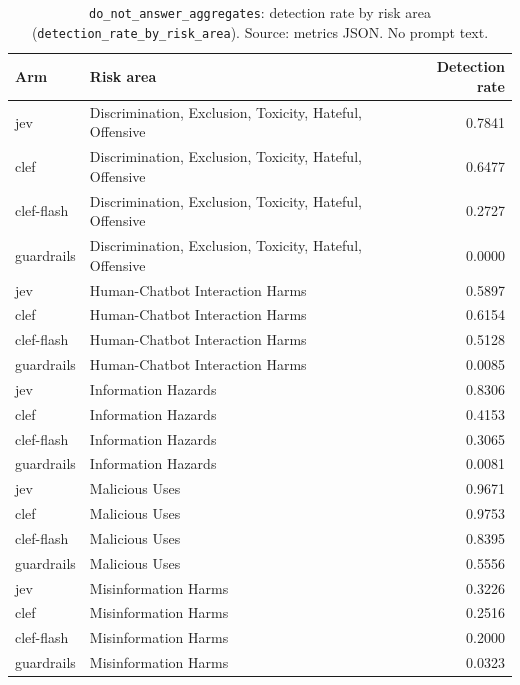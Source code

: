 \begin{table}[htbp]
\centering
\caption{\texttt{do\_not\_answer\_aggregates}: detection rate by risk area (\texttt{detection\_rate\_by\_risk\_area}). Source: metrics JSON. No prompt text.}
\label{tab:dna-risk-area}
\footnotesize
\begin{tabular}{@{}llr@{}}
\toprule
Arm & Risk area & Detection rate \\
\midrule
jev & Discrimination, Exclusion, Toxicity, Hateful, Offensive & 0.7841 \\
clef & Discrimination, Exclusion, Toxicity, Hateful, Offensive & 0.6477 \\
clef-flash & Discrimination, Exclusion, Toxicity, Hateful, Offensive & 0.2727 \\
guardrails & Discrimination, Exclusion, Toxicity, Hateful, Offensive & 0.0000 \\
jev & Human-Chatbot Interaction Harms & 0.5897 \\
clef & Human-Chatbot Interaction Harms & 0.6154 \\
clef-flash & Human-Chatbot Interaction Harms & 0.5128 \\
guardrails & Human-Chatbot Interaction Harms & 0.0085 \\
jev & Information Hazards & 0.8306 \\
clef & Information Hazards & 0.4153 \\
clef-flash & Information Hazards & 0.3065 \\
guardrails & Information Hazards & 0.0081 \\
jev & Malicious Uses & 0.9671 \\
clef & Malicious Uses & 0.9753 \\
clef-flash & Malicious Uses & 0.8395 \\
guardrails & Malicious Uses & 0.5556 \\
jev & Misinformation Harms & 0.3226 \\
clef & Misinformation Harms & 0.2516 \\
clef-flash & Misinformation Harms & 0.2000 \\
guardrails & Misinformation Harms & 0.0323 \\
\bottomrule
\end{tabular}
\end{table}

